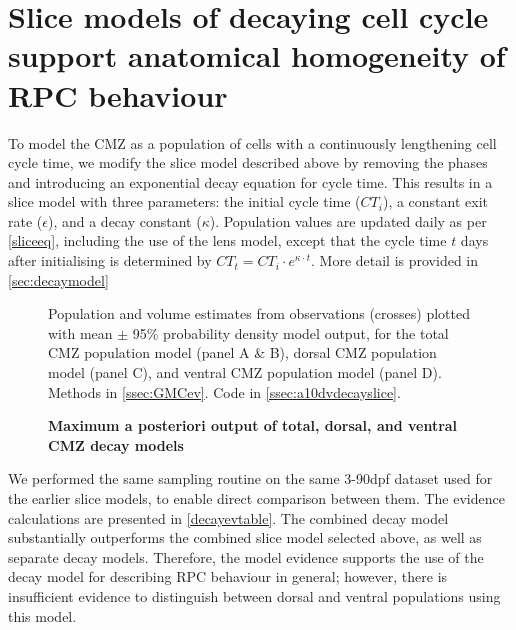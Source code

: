 \FloatBarrier

\section{Slice models of decaying cell cycle support anatomical homogeneity of RPC behaviour}
\label{sec:decaymodel}

To model the CMZ as a population of cells with a continuously lengthening cell cycle time, we modify the slice model described above by removing the phases and introducing an exponential decay equation for cycle time. This results in a slice model with three parameters: the initial cycle time ($CT_{i}$), a constant exit rate ($\epsilon$), and a decay constant ($\kappa$). Population values are updated daily as per \autoref{sliceeq}, including the use of the lens model, except that the cycle time $t$ days after initialising is determined by $CT_{t}=CT_{i} \cdot e^{\kappa \cdot t}$. More detail is provided in \autoref{sec:decaymodel}

\begin{figure}[!h]
    \caption{{\bf Maximum a posteriori output of total, dorsal, and ventral CMZ decay models}}
    \label{decayMAPoutput}
    Population and volume estimates from observations (crosses) plotted with mean $\pm$ 95\% probability density model output, for the total CMZ population model (panel A \& B), dorsal CMZ population model (panel C), and ventral CMZ population model (panel D).
    Methods in \autoref{ssec:GMCev}.
    Code in \autoref{ssec:a10dvdecayslice}. 
\end{figure}

We performed the same sampling routine on the same 3-90dpf dataset used for the earlier slice models, to enable direct comparison between them. The evidence calculations are presented in \autoref{decayevtable}. The combined decay model substantially outperforms the combined slice model selected above, as well as separate decay models. Therefore, the model evidence supports the use of the decay model for describing RPC behaviour in general; however, there is insufficient evidence to distinguish between dorsal and ventral populations using this model.

